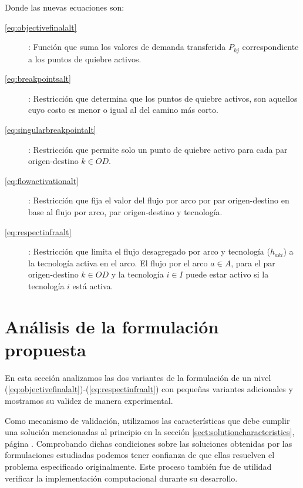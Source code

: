 Donde las nuevas ecuaciones son:

\begin{description}
  \item[\ref{eq:objectivefinalalt}]: Función que suma los valores de demanda transferida $P_{kj}$ correspondiente a los puntos de quiebre activos.
  \item[\ref{eq:breakpointsalt}]: Restricción que determina que los puntos de quiebre activos, son aquellos cuyo costo es menor o igual al del camino más corto.
  \item[\ref{eq:singularbreakpointalt}]: Restricción que permite solo un punto de quiebre activo para cada par origen-destino $k \in OD$.
  \item[\ref{eq:flowactivationalt}]: Restricción que fija el valor del flujo por arco por par origen-destino en base al flujo por arco, par origen-destino y tecnología.
  \item[\ref{eq:respectinfraalt}]: Restricción que limita el flujo desagregado por arco y tecnología ($h_{aki}$) a la tecnología activa en el arco. El flujo por el arco $a \in A$, para el par origen-destino $k \in OD$ y la tecnología $i \in I$ puede estar activo si la tecnología $i$ está activa.
\end{description}

\section{Análisis de la formulación propuesta}
\label{sect:formulationanalysis}

En esta sección analizamos las dos variantes de la formulación de un nivel (\ref{eq:objectivefinalalt})-(\ref{eq:respectinfraalt}) con pequeñas variantes adicionales y mostramos su validez de manera experimental.

Como mecanismo de validación, utilizamos las características que debe cumplir una solución mencionadas al principio en la sección \ref{sect:solutioncharacteristics}, página \pageref{sect:solutioncharacteristics}. Comprobando dichas condiciones sobre las soluciones obtenidas por las formulaciones estudiadas podemos tener confianza de que ellas resuelven el problema especificado originalmente. Este proceso también fue de utilidad verificar la implementación computacional durante su desarrollo.


